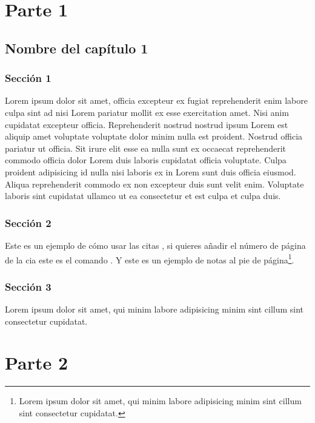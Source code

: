 \documentclass[12pt,twoside,left5mm,doublespacing]{bookest}
\begin{document}

\mainmatter
\part{Parte 1}

\chapter{Nombre del capítulo 1}

\section{Sección 1}

Lorem ipsum dolor sit amet, officia excepteur ex fugiat reprehenderit enim labore culpa sint ad nisi Lorem pariatur mollit ex esse exercitation amet. Nisi anim cupidatat excepteur officia. Reprehenderit nostrud nostrud ipsum Lorem est aliquip amet voluptate voluptate dolor minim nulla est proident. Nostrud officia pariatur ut officia. Sit irure elit esse ea nulla sunt ex occaecat reprehenderit commodo officia dolor Lorem duis laboris cupidatat officia voluptate. Culpa proident adipisicing id nulla nisi laboris ex in Lorem sunt duis officia eiusmod. Aliqua reprehenderit commodo ex non excepteur duis sunt velit enim. Voluptate laboris sint cupidatat ullamco ut ea consectetur et est culpa et culpa duis.


\section{Sección 2}
Este es un ejemplo de cómo usar las citas
\parencite{Sartlp}, si quieres añadir el número de página de
la cia este es el comando \parencite[50-60]{parmh}. Y este
es un ejemplo de notas al pie de página\footnote{Lorem ipsum
	dolor sit amet, qui minim labore adipisicing minim sint
	cillum sint consectetur cupidatat.}.


\section{Sección 3}

Lorem ipsum dolor sit amet, qui minim labore adipisicing minim sint cillum sint consectetur cupidatat.



\part{Parte 2}
\end{document}
